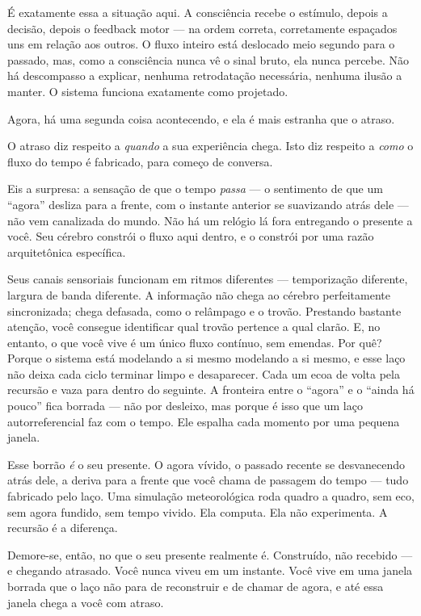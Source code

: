 \documentclass[11pt, twoside, openright]{book}
\begin{document}
É exatamente essa a situação aqui. A consciência recebe o estímulo, depois a decisão, depois o feedback motor --- na ordem correta, corretamente espaçados uns em relação aos outros. O fluxo inteiro está deslocado meio segundo para o passado, mas, como a consciência nunca vê o sinal bruto, ela nunca percebe. Não há descompasso a explicar, nenhuma retrodatação necessária, nenhuma ilusão a manter. O sistema funciona exatamente como projetado.

Agora, há uma segunda coisa acontecendo, e ela é mais estranha que o atraso.

O atraso diz respeito a \textit{quando} a sua experiência chega. Isto diz respeito a \textit{como} o fluxo do tempo é fabricado, para começo de conversa.

Eis a surpresa: a sensação de que o tempo \textit{passa} --- o sentimento de que um ``agora'' desliza para a frente, com o instante anterior se suavizando atrás dele --- não vem canalizada do mundo. Não há um relógio lá fora entregando o presente a você. Seu cérebro constrói o fluxo aqui dentro, e o constrói por uma razão arquitetônica específica.

Seus canais sensoriais funcionam em ritmos diferentes --- temporização diferente, largura de banda diferente. A informação não chega ao cérebro perfeitamente sincronizada; chega defasada, como o relâmpago e o trovão. Prestando bastante atenção, você consegue identificar qual trovão pertence a qual clarão. E, no entanto, o que você vive é um único fluxo contínuo, sem emendas. Por quê? Porque o sistema está modelando a si mesmo modelando a si mesmo, e esse laço não deixa cada ciclo terminar limpo e desaparecer. Cada um ecoa de volta pela recursão e vaza para dentro do seguinte. A fronteira entre o ``agora'' e o ``ainda há pouco'' fica borrada --- não por desleixo, mas porque é isso que um laço autorreferencial faz com o tempo. Ele espalha cada momento por uma pequena janela.

Esse borrão \textit{é} o seu presente. O agora vívido, o passado recente se desvanecendo atrás dele, a deriva para a frente que você chama de passagem do tempo --- tudo fabricado pelo laço. Uma simulação meteorológica roda quadro a quadro, sem eco, sem agora fundido, sem tempo vivido. Ela computa. Ela não experimenta. A recursão é a diferença.

Demore-se, então, no que o seu presente realmente é. Construído, não recebido --- e chegando atrasado. Você nunca viveu em um instante. Você vive em uma janela borrada que o laço não para de reconstruir e de chamar de agora, e até essa janela chega a você com atraso.
\end{document}
